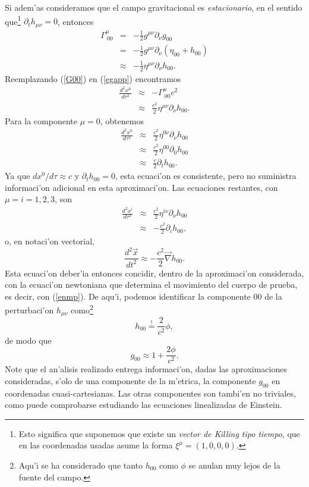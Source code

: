Si adem'as consideramos que el campo gravitacional es \textit{estacionario}, en el
sentido que\footnote{Esto significa que suponemos que existe un \textit{vector de Killing tipo tiempo}, que en las coordenadas usadas asume la forma $\xi^\mu=(1,0,0,0)$.} $\partial_t h_{\mu\nu}=0$, entonces
\begin{eqnarray}
 \Gamma_{\ 00}^\mu &=&-\frac{1}2g^{\mu\nu}\partial_\nu g_{00} \\
&=&-\frac{1}{2}g^{\mu\nu}
\partial_\nu\left( \eta_{00}+h_{00}\right) \\
&\approx&-\frac{1}2\eta^{\mu\nu}\partial_\nu h_{00}. \label{G00}
\end{eqnarray}
Reemplazando (\ref{G00}) en (\ref{egapp}) encontramos
\begin{eqnarray}
\frac{d^2x^\mu }{d\tau^2}&\approx& -\Gamma_{\ 00}^\mu c^2\\
&\approx& \frac{c^2}2\eta^{\mu\nu}\partial_\nu h_{00} .
\end{eqnarray}
Para la componente $\mu=0$, obtenemos
\begin{eqnarray}
\frac{d^2x^0}{d\tau^2}&\approx& \frac{c^2}2\eta^{0\nu}\partial_\nu h_{00}\\
&\approx& \frac{c^2}{2}\eta^{00}\partial_0 h_{00}\\
&\approx& \frac{c}{2}\partial_t h_{00}.
\end{eqnarray}
Ya que $dx^0/d\tau\approx c$ y $\partial_t h_{00}=0$, esta ecuaci'on es consistente,
pero no suministra informaci'on adicional en esta aproximaci'on. Las ecuaciones
restantes, con $\mu=i=1,2,3$, son
\begin{eqnarray}
\frac{d^2x^i}{d\tau^2}&\approx&\frac{c^2}{2}\eta^{i\nu}\partial_\nu h_{00} \\
&\approx&-\frac{c^2}{2}\partial_i h_{00},
\end{eqnarray}
o, en notaci'on vectorial,
\begin{equation}
 \frac{d^2\vec{x}}{dt^2}\approx -\frac{c^2}{2}\vec{\nabla}h_{00}.
\end{equation}
Esta ecuaci'on deber'ia entonces concidir, dentro de la aproximaci'on considerada,
con la ecuaci'on newtoniana que determina el movimiento del cuerpo de prueba, es decir, con (\ref{enmp}). De aqu'i, podemos
identificar la componente $00$ de la perturbaci'on $h_{\mu\nu}$ como\footnote{Aqu'i se ha considerado que tanto $h_{00}$ como $\phi$ se anulan muy lejos de la fuente del campo.}
\begin{equation}
h_{00}\stackrel{!}{=}\frac{2}{c^2}\phi, \label{h00phi}
\end{equation}
de modo que
\begin{equation}
\boxed{g_{00}\approx 1+\frac{2\phi}{c^2}.} \label{g00phi}
\end{equation}
Note que el an'alisis realizado entrega informaci'on, dadas las aproximaciones consideradas, s'olo de una componente de la m'etrica, la componente $g_{00}$ en coordenadas cuasi-cartesianas. Las otras componentes son tambi'en no triviales, como puede comprobarse estudiando las ecuaciones linealizadas de Einstein. 

